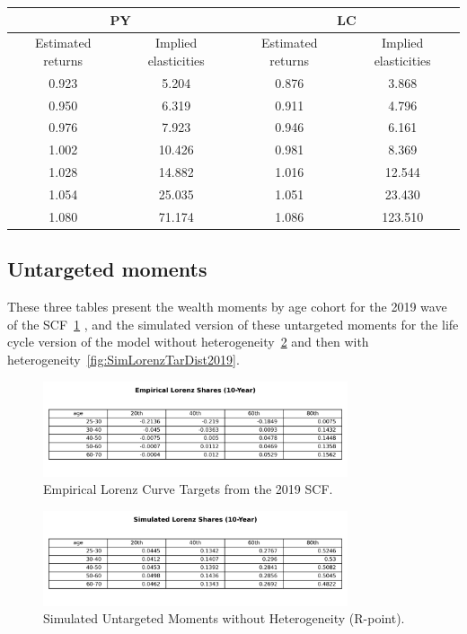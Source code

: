 \begin{center}
\begin{tabular}{|c|c|c|c|}
\hline
\multicolumn{2}{|c|}{PY} & \multicolumn{2}{|c|}{LC} \\
\hline
Estimated returns & Implied elasticities & Estimated returns & Implied elasticities \\
\hline
0.923 & 5.204 & 0.876 & 3.868 \\
0.950 & 6.319 & 0.911 & 4.796 \\
0.976 & 7.923 & 0.946 & 6.161 \\
1.002 & 10.426 & 0.981 & 8.369 \\
1.028 & 14.882 & 1.016 & 12.544 \\
1.054 & 25.035 & 1.051 & 23.430 \\
1.080 & 71.174 & 1.086 & 123.510 \\
\hline
\end{tabular}
\end{center}

\subsection{Untargeted moments}

\par These three tables present the wealth moments by age cohort for the 2019 wave of the SCF~\ref{fig:EmpLorenzTar2019} , and the simulated version of these untargeted moments for the life cycle version of the model without heterogeneity~\ref{fig:SimLorenzTarPoint2019} and then with heterogeneity~\ref{fig:SimLorenzTarDist2019}.

\begin{figure}[h]
\centering
\includegraphics[width=0.8\textwidth]{Tables/Emp_Lorenz_10yr_LCrrDistNetWorth_2019.png}
\caption{Empirical Lorenz Curve Targets from the 2019 SCF.}
\label{fig:EmpLorenzTar2019}
\end{figure}

\begin{figure}[htbp]
\centering
\includegraphics[width=0.8\textwidth]{Tables/Sim_Lorenz_10yr_LCrrPointNetWorth_2019.png}
\caption{Simulated Untargeted Moments without Heterogeneity (R-point).}
\label{fig:SimLorenzTarPoint2019}
\end{figure}

